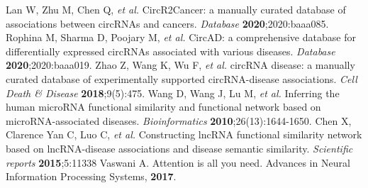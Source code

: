 \documentclass[journal=jcisd8,manuscript=article]{achemso}
\begin{document}
\begin{thebibliography}{}
Lan W, Zhu M, Chen Q, {\it et al.} CircR2Cancer: a manually curated database of associations between circRNAs and cancers. {\it Database} \textbf{2020};2020:baaa085.
Rophina M, Sharma D, Poojary M, {\it et al.} CircAD: a comprehensive database for differentially expressed circRNAs associated with various diseases. {\it Database} \textbf{2020};2020:baaa019.
Zhao Z, Wang K, Wu F, {\it et al.} circRNA disease: a manually curated database of experimentally supported circRNA-disease associations. {\it Cell Death \& Disease} \textbf{2018};9(5):475.
Wang D, Wang J, Lu M, {\it et al.} Inferring the human microRNA functional similarity and functional network based on microRNA-associated diseases. {\it Bioinformatics} \textbf{2010};26(13):1644-1650.
Chen X, Clarence Yan C, Luo C, {\it et al.} Constructing lncRNA functional similarity network based on lncRNA-disease associations and disease semantic similarity. {\it Scientific reports} \textbf{2015};5:11338
Vaswani A. Attention is all you need. Advances in Neural Information Processing Systems, \textbf{2017}.


\end{thebibliography}
\end{document}
